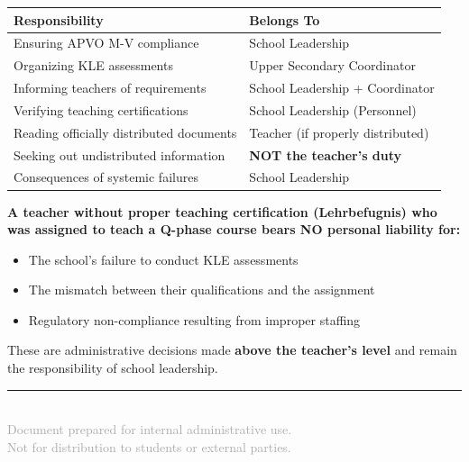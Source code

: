 \documentclass[11pt,a4paper]{article}
\begin{document}
\begin{center}
\begin{tabular}{p{6cm}p{7.5cm}}
\toprule
\textbf{Responsibility} & \textbf{Belongs To} \\
\midrule
Ensuring APVO M-V compliance & School Leadership \\
Organizing KLE assessments & Upper Secondary Coordinator \\
Informing teachers of requirements & School Leadership + Coordinator \\
Verifying teaching certifications & School Leadership (Personnel) \\
Reading officially distributed documents & Teacher (if properly distributed) \\
Seeking out undistributed information & \textbf{NOT the teacher's duty} \\
Consequences of systemic failures & School Leadership \\
\bottomrule
\end{tabular}
\end{center}

\vspace{1em}

\begin{warningbox}
\textbf{A teacher without proper teaching certification (Lehrbefugnis) who was assigned to teach a Q-phase course bears NO personal liability for:}
\begin{itemize}[nosep]
    \item The school's failure to conduct KLE assessments
    \item The mismatch between their qualifications and the assignment
    \item Regulatory non-compliance resulting from improper staffing
\end{itemize}
These are administrative decisions made \textbf{above the teacher's level} and remain the responsibility of school leadership.
\end{warningbox}

\vspace{2em}

\begin{center}
\rule{0.5\textwidth}{0.4pt}\\[1em]
{\small\textcolor{darkgray}{Document prepared for internal administrative use.\\
Not for distribution to students or external parties.}}
\end{center}
\end{document}
